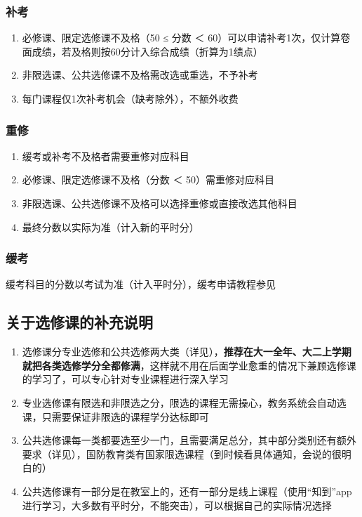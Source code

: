 \subsubsection[补考]{补考}
\begin{enumerate}
    \item 必修课、限定选修课不及格（50 ≤ 分数 ＜ 60）可以申请补考1次，仅计算卷面成绩，若及格则按60分计入综合成绩（折算为1绩点）
    \item 非限选课、公共选修课不及格需改选或重选，不予补考
    \item 每门课程仅1次补考机会（缺考除外），不额外收费
\end{enumerate}

\subsubsection[重修]{重修}
\begin{enumerate}
    \item 缓考或补考不及格者需要重修对应科目
    \item 必修课、限定选修课不及格（分数 ＜ 50）需重修对应科目
    \item 非限选课、公共选修课不及格可以选择重修或直接改选其他科目
    \item 最终分数以实际为准（计入新的平时分）
\end{enumerate}

\subsubsection[缓考]{缓考}
缓考科目的分数以考试为准（计入平时分），缓考申请教程参见


\subsection[关于选修课的补充说明]{关于选修课的补充说明}
\begin{enumerate}
    \item 选修课分专业选修和公共选修两大类（详见），\textbf{推荐在大一全年、大二上学期就把各类选修学分全都修满}，这样就不用在后面学业愈重的情况下兼顾选修课的学习了，可以专心针对专业课程进行深入学习
    \item 专业选修课有限选和非限选之分，限选的课程无需操心，教务系统会自动选课，只需要保证非限选的课程学分达标即可
    \item 公共选修课每一类都要选至少一门，且需要满足总分，其中部分类别还有额外要求（详见），国防教育类有国家限选课程（到时候看具体通知，会说的很明白的）
    \item 公共选修课有一部分是在教室上的，还有一部分是线上课程（使用“知到”app进行学习，大多数有平时分，不能突击），可以根据自己的实际情况选择\footnotemark
\end{enumerate}

